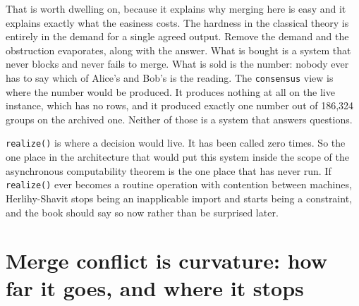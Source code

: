 That is worth dwelling on, because it explains why merging here is easy and it explains exactly what the easiness costs. The hardness in the classical theory is entirely in the demand for a single agreed output. Remove the demand and the obstruction evaporates, along with the answer. What is bought is a system that never blocks and never fails to merge. What is sold is the number: nobody ever has to say which of Alice's \labReadingA{} and Bob's \labReadingB{} is the reading. The \texttt{consensus} view is where the number would be produced. It produces nothing at all on the live instance, which has no rows, and it produced exactly one number out of 186,324 groups on the archived one. Neither of those is a system that answers questions.

\texttt{realize()} is where a decision would live. It has been called zero times. So the one place in the architecture that would put this system inside the scope of the asynchronous computability theorem is the one place that has never run. If \texttt{realize()} ever becomes a routine operation with contention between machines, Herlihy-Shavit stops being an inapplicable import and starts being a constraint, and the book should say so now rather than be surprised later.

\section{Merge conflict is curvature: how far it goes, and where it stops}


